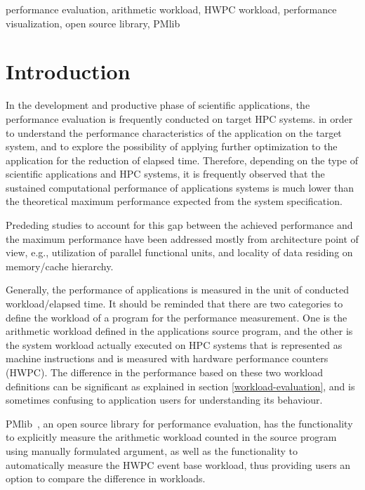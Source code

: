 \documentclass[conference]{IEEEtran}
\begin{document}
\begin{IEEEkeywords}
performance evaluation,
arithmetic workload,
HWPC workload,
performance visualization,
open source library,
PMlib
\end{IEEEkeywords}

\section{Introduction}
In the development and productive phase of scientific applications,
the performance evaluation is frequently conducted on target HPC systems.
in order to understand the performance characteristics
of the application on the target system, and to explore the possibility of
applying further optimization to the application for the reduction of elapsed time.
Therefore,
depending on the type of scientific applications and HPC systems,
it is frequently observed that
the sustained computational performance of applications
systems is much lower than the theoretical maximum performance
expected from the system specification.

Prededing studies to account for this gap between the achieved
performance and the maximum performance have been addressed mostly from
architecture point of view, e.g., 
utilization of parallel functional units,
and locality of data residing on memory/cache hierarchy.

Generally, the performance of applications is measured in the unit of conducted workload/elapsed time.
It should be reminded that there are two categories to define the workload
of a program for the performance measurement. 
One is the arithmetic workload defined in the applications source program,
and the other is the system workload actually executed on HPC systems
that is represented as machine instructions  and is measured with
hardware performance counters (HWPC).
The difference in the performance based on these two workload definitions
can be significant as explained in section \ref{workload-evaluation},
and is sometimes confusing to application users for understanding
its behaviour.

PMlib~\cite{PMlib:webpage-public}, an open source library for performance
evaluation, has the functionality
to explicitly measure the arithmetic workload counted in the source program
using manually formulated argument, as well as the functionality
to automatically measure the HWPC event base workload,
thus providing users an option to compare the difference in workloads.
\end{document}
